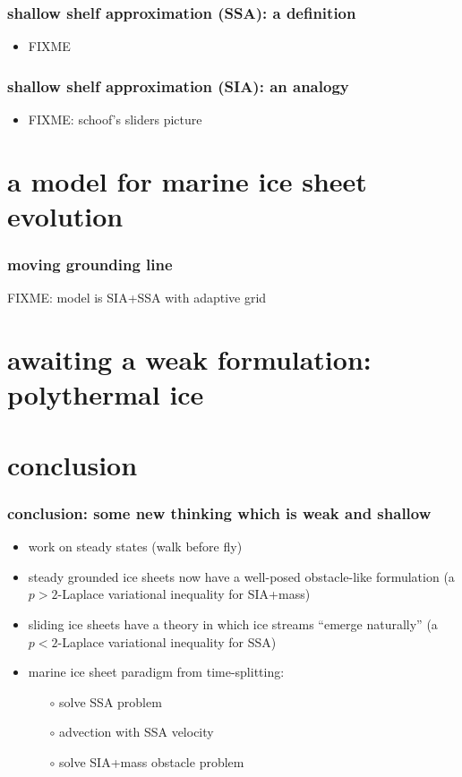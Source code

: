 \documentclass{beamer}
\begin{document}
\begin{frame}
  \frametitle{shallow shelf approximation (SSA): a definition}

\begin{itemize}
\item FIXME
\end{itemize}
\end{frame}


\begin{frame}
  \frametitle{shallow shelf approximation (SIA): an analogy}

\begin{itemize}
\item FIXME: schoof's sliders picture
\end{itemize}
\end{frame}


\section[marine ice sheets]{a model for marine ice sheet evolution}

\begin{frame}
  \frametitle{moving grounding line}

FIXME: model is SIA+SSA with adaptive grid

\begin{center}
\end{center}
\end{frame}


\section[polythermal ice]{awaiting a weak formulation: polythermal ice}

\section*{conclusion}

\begin{frame}
  \frametitle{conclusion: some new thinking which is weak and shallow}

\begin{itemize}
\item work on steady states (walk before fly)
\item steady grounded ice sheets now have a well-posed obstacle-like formulation (a $p>2$-Laplace variational inequality for SIA+mass)
\item sliding ice sheets have a theory in which ice streams ``emerge naturally'' (a $p<2$-Laplace variational inequality for SSA)
\item marine ice sheet paradigm from time-splitting:
  \begin{itemize}
  \item[$\circ$]  solve SSA problem
  \item[$\circ$]  advection with SSA velocity
  \item[$\circ$]  solve SIA+mass obstacle problem
  \end{itemize}
\end{itemize}
\end{frame}
\end{document}
